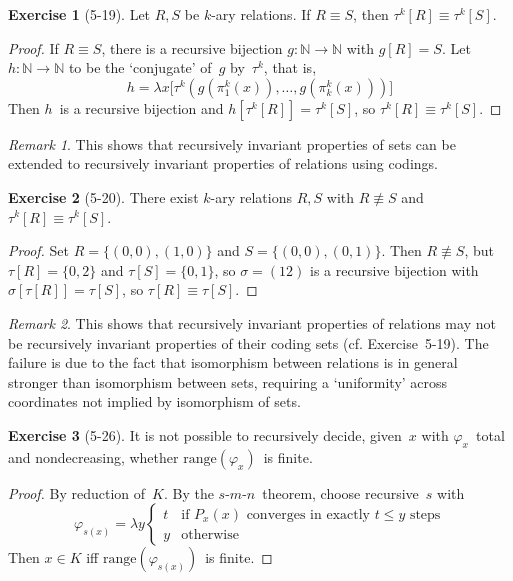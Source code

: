 \documentclass[letterpaper]{article}
\newcommand{\N}{\mathbb{N}}
\newcommand{\iso}{\equiv}
\newcommand{\ran}{\mathrm{range}}
\newcommand{\smn}{$s$-$m$-$n$}
\theoremstyle{definition}
\newtheorem*{exer}{Exercise}
\theoremstyle{remark}
\newtheorem*{rmk}{Remark}
\theoremstyle{direction}
\begin{document}
\begin{exer}[5-19]
Let $R,S$ be $k$-ary relations. If $R\iso S$, then $\tau^k[R]\iso\tau^k[S]$.
\end{exer}
\begin{proof}
If $R\iso S$, there is a recursive bijection $g:\N\to\N$ with $g[R]=S$. Let $h:\N\to\N$ to be the `conjugate' of~$g$ by~$\tau^k$, that is,
$$h=\lambda x\bigl[\tau^k(g(\pi_1^k(x)),\ldots,g(\pi_k^k(x)))\bigr]$$
Then $h$~is a recursive bijection and $h[\tau^k[R]]=\tau^k[S]$, so $\tau^k[R]\iso\tau^k[S]$.
\end{proof}
\begin{rmk}
This shows that recursively invariant properties of sets can be extended to recursively invariant properties of relations using codings.
\end{rmk}

\begin{exer}[5-20]
There exist $k$-ary relations $R,S$ with $R\not\iso S$ and $\tau^k[R]\iso\tau^k[S]$.
\end{exer}
\begin{proof}
Set $R=\{(0,0),(1,0)\}$ and $S=\{(0,0),(0,1)\}$. Then $R\not\iso S$, but $\tau[R]=\{0,2\}$ and $\tau[S]=\{0,1\}$, so $\sigma=(12)$ is a recursive bijection with $\sigma[\tau[R]]=\tau[S]$, so $\tau[R]\iso\tau[S]$.
\end{proof}
\begin{rmk}
This shows that recursively invariant properties of relations may not be recursively invariant properties of their coding sets (cf. Exercise~5-19). The failure is due to the fact that isomorphism between relations is in general stronger than isomorphism between sets, requiring a `uniformity' across coordinates not implied by isomorphism of sets.
\end{rmk}

\begin{exer}[5-26]
It is not possible to recursively decide, given~$x$ with $\varphi_x$~total and nondecreasing, whether $\ran(\varphi_x)$~is finite.
\end{exer}
\begin{proof}
By reduction of~$K$. By the \smn\ theorem, choose recursive~$s$ with
$$\varphi_{s(x)}=\lambda y\begin{cases}
t&\text{if }P_x(x)\text{ converges in exactly }t\le y\text{ steps}\\
y&\text{otherwise}
\end{cases}$$
Then $x\in K$ iff $\ran(\varphi_{s(x)})$~is finite.
\end{proof}
\end{document}
